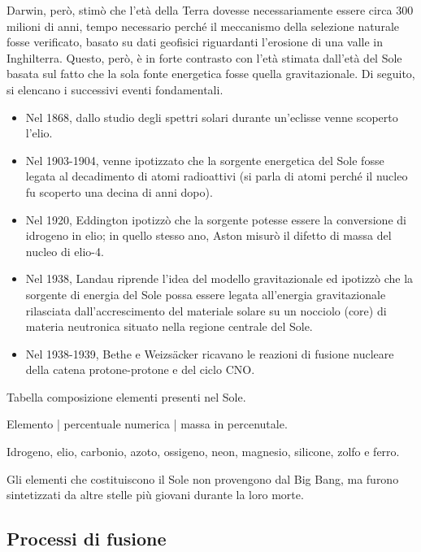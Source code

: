 \documentclass[11pt, a4paper]{scrartcl}
\theoremstyle{style}
\newenvironment{boxenv}[1][]{
    \begin{eqbox}[#1]
    }{
   \end{eqbox}
}
\numberwithin{equation}{subsection}
\begin{document}
Darwin, per\`o, stim\`o che l'et\`a della Terra dovesse necessariamente essere circa $300$ milioni di anni, tempo necessario perch\'e il meccanismo della selezione naturale fosse verificato, basato su dati geofisici riguardanti l'erosione di una valle in Inghilterra.
Questo, per\`o, \`e in forte contrasto con l'et\`a stimata dall'et\`a del Sole basata sul fatto che la sola fonte energetica fosse quella gravitazionale.
Di seguito, si elencano i successivi eventi fondamentali.
\begin{itemize}
	\item Nel 1868, dallo studio degli spettri solari durante un'eclisse venne scoperto l'elio.
	\item Nel 1903-1904, venne ipotizzato che la sorgente energetica del Sole fosse legata al decadimento di atomi radioattivi (si parla di atomi perch\'e il nucleo fu scoperto una decina di anni dopo).
	\item Nel 1920, Eddington ipotizz\`o che la sorgente potesse essere la conversione di idrogeno in elio; in quello stesso ano, Aston misur\`o il difetto di massa del nucleo di elio-4.
	\item Nel 1938, Landau riprende l'idea del modello gravitazionale ed ipotizz\`o che la sorgente di energia del Sole possa essere legata all'energia gravitazionale rilasciata dall'accrescimento del materiale solare su un nocciolo (core) di materia neutronica situato nella regione centrale del Sole.
	\item Nel 1938-1939, Bethe e Weizs\"acker ricavano le reazioni di fusione nucleare della catena protone-protone e del ciclo CNO.
\end{itemize}
\begin{boxenv}[]
Tabella composizione elementi presenti nel Sole. 

\noindent Elemento | percentuale numerica | massa in percenutale.

Idrogeno, elio, carbonio, azoto, ossigeno, neon, magnesio, silicone, zolfo e ferro.
\end{boxenv}
\noindent Gli elementi che costituiscono il Sole non provengono dal Big Bang, ma furono sintetizzati da altre stelle pi\`u giovani durante la loro morte.

\subsection{Processi di fusione}
\end{document}
